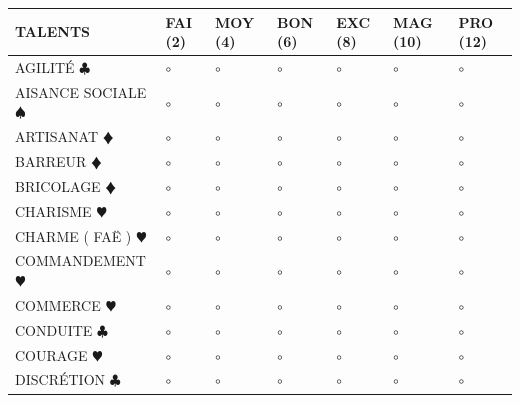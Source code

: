 \documentclass[a5paper,french]{article}
\begin{document}

\begin{tabular}[c]{|p{}|p{}|p{}|p{}|p{}|p{}|p{}|}
	\hline
	\textbf{TALENTS}									&	FAI (2)	&	MOY (4)	&	BON (6)	&	EXC (8)	&	MAG (10)	&	PRO (12)	\\ \hline
	AGILITÉ { $\clubsuit$ }								&	$\circ$	&	$\circ$	&	$\circ$	&	$\circ$	&	$\circ$		&	$\circ$		\\ \hline
	AISANCE SOCIALE { $\spadesuit$ }					&	$\circ$	&	$\circ$	&	$\circ$	&	$\circ$	&	$\circ$		&	$\circ$		\\ \hline
	ARTISANAT {\color{red} $\vardiamond$ }				&	$\circ$	&	$\circ$	&	$\circ$	&	$\circ$	&	$\circ$		&	$\circ$		\\ \hline	
	BARREUR {\color{red} $\vardiamond$ }				&	$\circ$	&	$\circ$	&	$\circ$	&	$\circ$	&	$\circ$		&	$\circ$		\\ \hline
	BRICOLAGE {\color{red} $\vardiamond$ }				&	$\circ$	&	$\circ$	&	$\circ$	&	$\circ$	&	$\circ$		&	$\circ$		\\ \hline
	CHARISME {\color{red} $\varheart$ }					&	$\circ$	&	$\circ$	&	$\circ$	&	$\circ$	&	$\circ$		&	$\circ$		\\ \hline
	CHARME ( FAË ) {\color{red} $\varheart$ }			&	$\circ$	&	$\circ$	&	$\circ$	&	$\circ$	&	$\circ$		&	$\circ$		\\ \hline
	COMMANDEMENT {\color{red} $\varheart$ }				&	$\circ$	&	$\circ$	&	$\circ$	&	$\circ$	&	$\circ$		&	$\circ$		\\ \hline
	COMMERCE {\color{red} $\varheart$ }					&	$\circ$	&	$\circ$	&	$\circ$	&	$\circ$	&	$\circ$		&	$\circ$		\\ \hline
	CONDUITE { $\clubsuit$ }							&	$\circ$	&	$\circ$	&	$\circ$	&	$\circ$	&	$\circ$		&	$\circ$		\\ \hline
	COURAGE {\color{red} $\varheart$ }					&	$\circ$	&	$\circ$	&	$\circ$	&	$\circ$	&	$\circ$		&	$\circ$		\\ \hline
	DISCRÉTION { $\clubsuit$ }							&	$\circ$	&	$\circ$	&	$\circ$	&	$\circ$	&	$\circ$		&	$\circ$		\\ \hline

\end{tabular}
\end{document}

